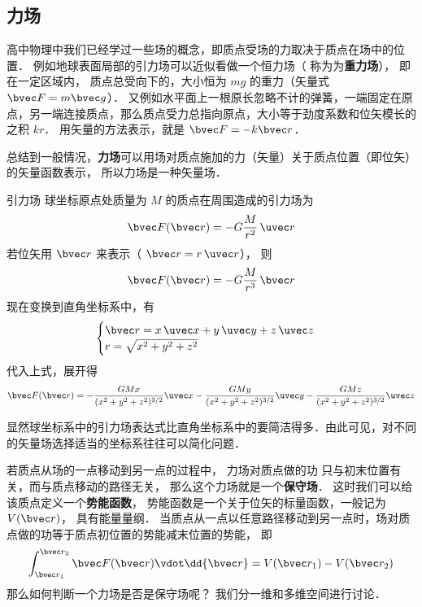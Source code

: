 

\subsection{力场}
高中物理中我们已经学过一些场的概念，即质点受场的力取决于质点在场中的位置． 例如地球表面局部的引力场可以近似看做一个恒力场（ 称为为\textbf{重力场}）， 即在一定区域内， 质点总受向下的，大小恒为 $mg$ 的重力（矢量式 $\bvec F = m\bvec g$）． 又例如水平面上一根原长忽略不计的弹簧，一端固定在原点，另一端连接质点，那么质点受力总指向原点，大小等于劲度系数和位矢模长的之积 $kr$． 用矢量的方法表示，就是 $\bvec F = -k\bvec r$．

总结到一般情况，\textbf{力场}可以用场对质点施加的力（矢量）关于质点位置（即位矢）的矢量函数表示， 所以力场是一种矢量场．


\begin{example}{引力场}\label{V_ex1}
球坐标原点处质量为 $M$ 的质点在周围造成的引力场为
\begin{equation}
\bvec F(\bvec r) =  - G\frac{M}{r^2}\,\uvec r
\end{equation} 
若位矢用 $\bvec r$ 来表示（ $\bvec r = r\,\uvec r$）， 则
\begin{equation}
\bvec F(\bvec r) =  - G\frac{M}{r^3}\,\bvec r
\end{equation}
现在变换到直角坐标系中，有
\begin{equation}
\begin{cases}
\bvec r = x\,\uvec x + y\,\uvec y + z\,\uvec z\\
r = \sqrt{x^2 + y^2 + z^2} 
\end{cases}
\end{equation} 
代入上式，展开得
\begin{equation}
\bvec F(\bvec r) =  - \frac{GMx}{(x^2+y^2+z^2)^{3/2}}\uvec x - \frac{GMy}{(x^2 +y^2+z^2)^{3/2}}\uvec y - \frac{GMz}{(x^2+y^2+z^2)^{3/2}}\uvec z 
\end{equation} 

显然球坐标系中的引力场表达式比直角坐标系中的要简洁得多．由此可见，对不同的矢量场选择适当的坐标系往往可以简化问题．
\end{example}

若质点从场的一点移动到另一点的过程中， 力场对质点做的功 只与初末位置有关，而与质点移动的路径无关， 那么这个力场就是一个\textbf{保守场}． 这时我们可以给该质点定义一个\textbf{势能函数}， 势能函数是一个关于位矢的标量函数，一般记为 $V(\bvec r)$， 具有能量量纲． 当质点从一点以任意路径移动到另一点时，场对质点做的功等于质点初位置的势能减末位置的势能， 即
\begin{equation}\label{V_eq1}
\int_{\bvec r_1}^{\bvec r_2} \bvec F(\bvec r) \vdot \dd{\bvec r} = V(\bvec r_1)-V(\bvec r_2)
\end{equation}
那么如何判断一个力场是否是保守场呢？ 我们分一维和多维空间进行讨论．

